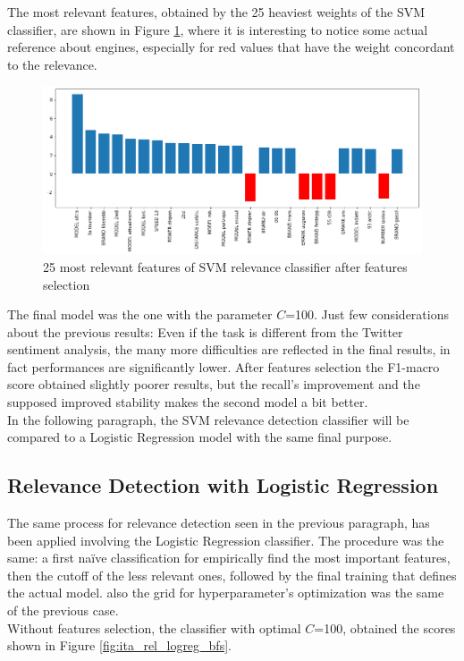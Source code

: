 The most relevant features, obtained by the 25 heaviest weights of the SVM classifier, are shown in Figure \ref{fig:ita_rel_svm_feat}, where it is interesting to notice some actual reference about engines, especially for red values that have the weight concordant to the relevance.

\begin{figure}[H]
	\centering
	\includegraphics[width=\textwidth]{figures/conf_matrices/ita_rel_svm/svm_rel_best_feat.png}
	\caption{25 most relevant features of SVM relevance classifier after features selection}
	\label{fig:ita_rel_svm_feat}
\end{figure}

The final model was the one with the parameter $C$=100. Just few considerations about the previous results: Even if the task is different from the Twitter sentiment analysis, the many more difficulties are reflected in the final results, in fact performances are significantly lower. After features selection the F1-macro score obtained slightly poorer results, but the recall's improvement and the supposed improved stability makes the second model a bit better.\\
In the following paragraph, the SVM relevance detection classifier will be compared to a Logistic Regression model with the same final purpose.


\subsection{Relevance Detection with Logistic Regression}

The same process for relevance detection seen in the previous paragraph, has been applied involving the Logistic Regression classifier. The procedure was the same: a first na{\"i}ve classification for empirically find the most important features, then the cutoff of the less relevant ones, followed by the final training that defines the actual model. also the grid for hyperparameter's optimization was the same of the previous case.\\
Without features selection, the classifier with optimal $C$=100, obtained the scores shown in Figure \ref{fig:ita_rel_logreg_bfs}.

